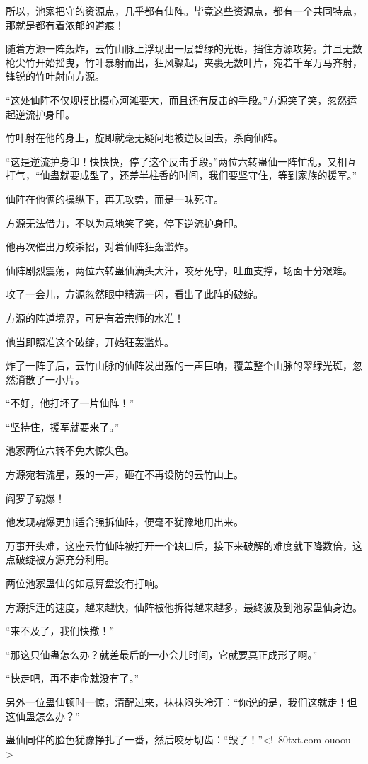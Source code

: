 \begin{this_body}
所以，池家把守的资源点，几乎都有仙阵。毕竟这些资源点，都有一个共同特点，那就是都有着浓郁的道痕！

随着方源一阵轰炸，云竹山脉上浮现出一层碧绿的光斑，挡住方源攻势。并且无数枪尖竹开始摇曳，竹叶暴射而出，狂风骤起，夹裹无数叶片，宛若千军万马齐射，锋锐的竹叶射向方源。

“这处仙阵不仅规模比摄心河滩要大，而且还有反击的手段。”方源笑了笑，忽然运起逆流护身印。

竹叶射在他的身上，旋即就毫无疑问地被逆反回去，杀向仙阵。

“这是逆流护身印！快快快，停了这个反击手段。”两位六转蛊仙一阵忙乱，又相互打气，“仙蛊就要成型了，还差半柱香的时间，我们要坚守住，等到家族的援军。”

仙阵在他俩的操纵下，再无攻势，而是一味死守。

方源无法借力，不以为意地笑了笑，停下逆流护身印。

他再次催出万蛟杀招，对着仙阵狂轰滥炸。

仙阵剧烈震荡，两位六转蛊仙满头大汗，咬牙死守，吐血支撑，场面十分艰难。

攻了一会儿，方源忽然眼中精满一闪，看出了此阵的破绽。

方源的阵道境界，可是有着宗师的水准！

他当即照准这个破绽，开始狂轰滥炸。

炸了一阵子后，云竹山脉的仙阵发出轰的一声巨响，覆盖整个山脉的翠绿光斑，忽然消散了一小片。

“不好，他打坏了一片仙阵！”

“坚持住，援军就要来了。”

池家两位六转不免大惊失色。

方源宛若流星，轰的一声，砸在不再设防的云竹山上。

阎罗子魂爆！

他发现魂爆更加适合强拆仙阵，便毫不犹豫地用出来。

万事开头难，这座云竹仙阵被打开一个缺口后，接下来破解的难度就下降数倍，这点破绽被方源充分利用。

两位池家蛊仙的如意算盘没有打响。

方源拆迁的速度，越来越快，仙阵被他拆得越来越多，最终波及到池家蛊仙身边。

“来不及了，我们快撤！”

“那这只仙蛊怎么办？就差最后的一小会儿时间，它就要真正成形了啊。”

“快走吧，再不走命就没有了。”

另外一位蛊仙顿时一惊，清醒过来，抹抹闷头冷汗：“你说的是，我们这就走！但这仙蛊怎么办？”

蛊仙同伴的脸色犹豫挣扎了一番，然后咬牙切齿：“毁了！”<!--80txt.com-ouoou-->

\end{this_body}


